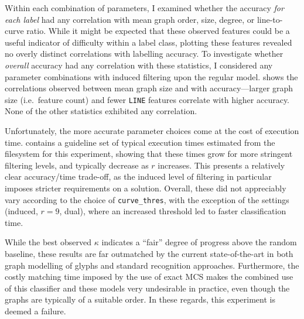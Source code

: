 \documentclass{mpaper}
\begin{document}

Within each combination of parameters, I examined whether the accuracy \emph{for each label} had any correlation with mean graph order, size, degree, or line-to-curve ratio.
While it might be expected that these observed features could be a useful indicator of difficulty within a label class, plotting these features revealed no overly distinct correlations with labelling accuracy.
To investigate whether \emph{overall} accuracy had any correlation with these statistics, I considered any parameter combinations with induced filtering upon the regular model.
 shows the correlations observed between mean graph size and with accuracy---larger graph size (i.e.\ feature count) and fewer \texttt{LINE} features correlate with higher accuracy.
None of the other statistics exhibited any correlation.

Unfortunately, the more accurate parameter choices come at the cost of execution time.
 contains a guideline set of typical execution times estimated from the filesystem for this experiment, showing that these times grow for more stringent filtering levels, and typically decrease as $r$ increases.
This presents a relatively clear accuracy/time trade-off, as the induced level of filtering in particular imposes stricter requirements on a solution.
Overall, these did not appreciably vary according to the choice of \texttt{curve\_thres}, with the exception of the settings (induced, $r=9$, dual), where an increased threshold led to faster classification time.

While the best observed $\kappa$ indicates a ``fair'' degree of progress above the random baseline, these results are far outmatched by the current state-of-the-art in both graph modelling of glyphs and standard recognition approaches.
Furthermore, the costly matching time imposed by the use of exact MCS makes the combined use of this classifier and these models very undesirable in practice, even though the graphs are typically of a suitable order.
In these regards, this experiment is deemed a failure.
\end{document}
